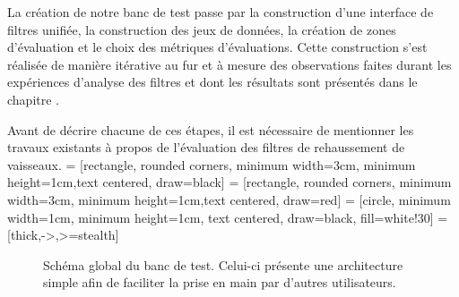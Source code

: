 La création de notre banc de test passe par la construction d'une interface de filtres unifiée, la construction des jeux de données, la création de zones d'évaluation et le choix des métriques d'évaluations. Cette construction s'est réalisée de manière itérative au fur et à mesure des observations faites durant les expériences d'analyse des filtres et dont les résultats sont présentés dans le chapitre \chapAnalysisN{}.

Avant de décrire chacune de ces étapes, il est nécessaire de mentionner les travaux existants à propos de l'évaluation des filtres de rehaussement de vaisseaux.
 = [rectangle, rounded corners, minimum width=3cm, minimum height=1cm,text centered, draw=black]
 = [rectangle, rounded corners, minimum width=3cm, minimum height=1cm,text centered, draw=red]
 = [circle, minimum width=1cm, minimum height=1cm, text centered, draw=black, fill=white!30]
 = [thick,->,>=stealth]
\begin{figure}[!ht]
  \centering
  \caption{Schéma global du banc de test. Celui-ci présente une architecture simple afin de faciliter la prise en main par d'autres utilisateurs.}
  \label{fig:schéma banc de test}
\end{figure}
